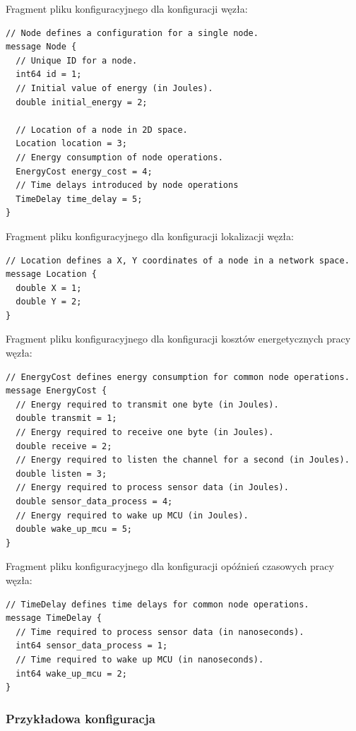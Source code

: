 \documentclass[a4paper,12pt,twoside,openany]{report}
\begin{document}
Fragment pliku konfiguracyjnego dla konfiguracji węzła:

\begin{lstlisting}
// Node defines a configuration for a single node.
message Node {
  // Unique ID for a node.
  int64 id = 1;
  // Initial value of energy (in Joules). 
  double initial_energy = 2;

  // Location of a node in 2D space.
  Location location = 3;
  // Energy consumption of node operations.
  EnergyCost energy_cost = 4;
  // Time delays introduced by node operations
  TimeDelay time_delay = 5;
}
\end{lstlisting}

Fragment pliku konfiguracyjnego dla konfiguracji lokalizacji węzła:

\begin{lstlisting}
// Location defines a X, Y coordinates of a node in a network space.
message Location {
  double X = 1;
  double Y = 2;
}
\end{lstlisting}

Fragment pliku konfiguracyjnego dla konfiguracji kosztów energetycznych pracy węzła:

\begin{lstlisting}
// EnergyCost defines energy consumption for common node operations.
message EnergyCost {
  // Energy required to transmit one byte (in Joules).
  double transmit = 1;
  // Energy required to receive one byte (in Joules).
  double receive = 2;
  // Energy required to listen the channel for a second (in Joules).
  double listen = 3;
  // Energy required to process sensor data (in Joules).
  double sensor_data_process = 4;
  // Energy required to wake up MCU (in Joules).
  double wake_up_mcu = 5;
}
\end{lstlisting}

Fragment pliku konfiguracyjnego dla konfiguracji opóźnień czasowych pracy węzła:

\begin{lstlisting}
// TimeDelay defines time delays for common node operations.
message TimeDelay {
  // Time required to process sensor data (in nanoseconds).
  int64 sensor_data_process = 1;
  // Time required to wake up MCU (in nanoseconds).
  int64 wake_up_mcu = 2;
}
\end{lstlisting}

\subsubsection{Przykładowa konfiguracja}
\end{document}
